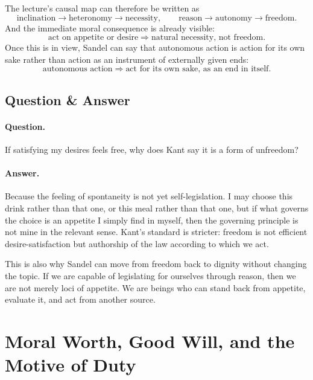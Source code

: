 The lecture's causal map can therefore be written as
\begin{equation}
\text{inclination} \to \text{heteronomy} \to \text{necessity},
\qquad
\text{reason} \to \text{autonomy} \to \text{freedom}.
\end{equation}
And the immediate moral consequence is already visible:
\begin{equation}
\text{act on appetite or desire} \Longrightarrow \text{natural necessity, not freedom}.
\end{equation}
Once this is in view, Sandel can say that autonomous action is action for its own sake rather than action as an instrument of externally given ends:
\begin{equation}
\text{autonomous action} \Longrightarrow \text{act for its own sake, as an end in itself}.
\end{equation}

\subsection{Question \& Answer}

\paragraph{Question.} If satisfying my desires feels free, why does Kant say it is a form of unfreedom?

\paragraph{Answer.} Because the feeling of spontaneity is not yet self-legislation. I may choose this drink rather than that one, or this meal rather than that one, but if what governs the choice is an appetite I simply find in myself, then the governing principle is not mine in the relevant sense. Kant's standard is stricter: freedom is not efficient desire-satisfaction but authorship of the law according to which we act.

This is also why Sandel can move from freedom back to dignity without changing the topic. If we are capable of legislating for ourselves through reason, then we are not merely loci of appetite. We are beings who can stand back from appetite, evaluate it, and act from another source.

\section{Moral Worth, Good Will, and the Motive of Duty}

